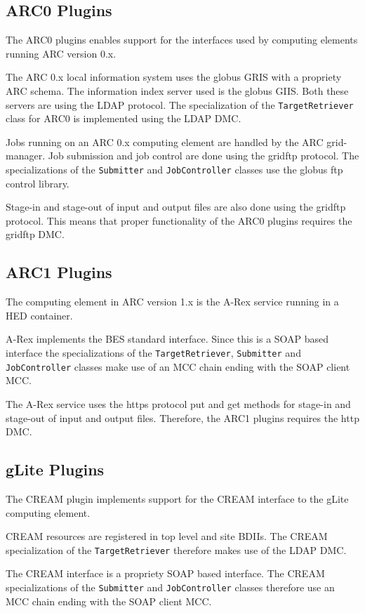 \documentclass{book}
\newcommand{\TargetRetriever}{\texttt{TargetRetriever}}
\newcommand{\Submitter}{\texttt{Submitter}}
\newcommand{\JobController}{\texttt{JobController}}
\begin{document}
\subsection{ARC0 Plugins}

The ARC0 plugins enables support for the interfaces used by computing
elements running ARC version 0.x.

The ARC 0.x local information system uses the globus GRIS with a
propriety ARC schema. The information index server used is the globus
GIIS. Both these servers are using the LDAP protocol. The
specialization of the {\TargetRetriever} class for ARC0 is implemented
using the LDAP DMC.

Jobs running on an ARC 0.x computing element are handled by the ARC
grid-manager. Job submission and job control are done using the
gridftp protocol. The specializations of the {\Submitter} and
{\JobController} classes use the globus ftp control library.

Stage-in and stage-out of input and output files are also done using
the gridftp protocol. This means that proper functionality of the ARC0
plugins requires the gridftp DMC.

\subsection{ARC1 Plugins}

The computing element in ARC version 1.x is the A-Rex service running
in a HED container.

A-Rex implements the BES standard interface. Since this is a SOAP
based interface the specializations of the {\TargetRetriever},
{\Submitter} and {\JobController} classes make use of an MCC chain
ending with the SOAP client MCC.

The A-Rex service uses the https protocol put and get methods for
stage-in and stage-out of input and output files. Therefore, the ARC1
plugins requires the http DMC.

\subsection{gLite Plugins}

The CREAM plugin implements support for the CREAM interface to the
gLite computing element.

CREAM resources are registered in top level and site BDIIs. The CREAM
specialization of the {\TargetRetriever} therefore makes use of the
LDAP DMC.

The CREAM interface is a propriety SOAP based interface. The CREAM
specializations of the {\Submitter} and {\JobController} classes
therefore use an MCC chain ending with the SOAP client MCC.
\end{document}

